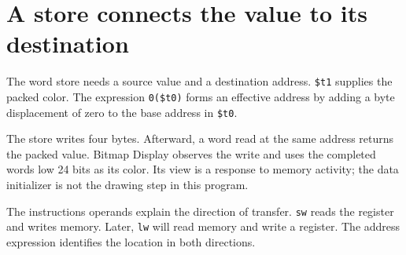 \section{A store connects the value to its
  destination}\label{002-single-pixel-p04-a-store-connects-the-value-to-its-destination}

The word store needs a source value and a destination address.
\texttt{\$t1} supplies the packed color. The expression \texttt{0(\$t0)}
forms an effective address by adding a byte displacement of zero to the
base address in \texttt{\$t0}.

The store writes four bytes. Afterward, a word read at the same address
returns the packed value. Bitmap Display observes the write and uses the
completed word\textquotesingle s low 24 bits as its color. Its view is a
response to memory activity; the data initializer is not the drawing
step in this program.

The instruction\textquotesingle s operands explain the direction of
transfer. \texttt{sw} reads the register and writes memory. Later,
\texttt{lw} will read memory and write a register. The address
expression identifies the location in both directions.
